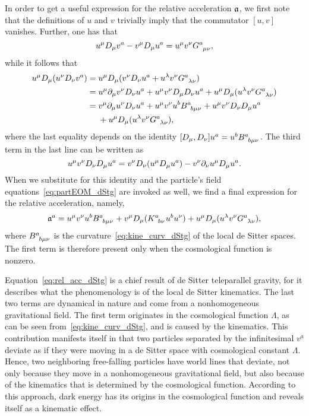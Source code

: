 \documentclass[
final,
11pt,
a4paper,
DIV=11,
headinclude=true,
footinclude=false,
bibliography=totoc,
twoside=true,  %
BCOR=5mm
]{scrbook}
\begin{document}
In order to get a useful expression for the relative acceleration 
$\mathfrak{a}$, we first note that the definitions of $u$ and $v$ 
trivially imply that the commutator $[u, v]$ vanishes. Further, 
one has that
\begin{equation*}
  u^\mu D_\mu v^a - v^\mu D_\mu u^a = u^\mu v^\nu 
  G\ind{^a_{\mu\nu}},
\end{equation*}
while it follows that
\begin{align*}
  u^\mu D_\mu (u^\nu D_\nu v^a)
  &= u^\mu D_\mu (v^\nu D_\nu u^a + u^\lambda v^\nu 
  G\ind{^a_{\lambda\nu}})
  \\
  &= u^\mu \pd_\mu v^\nu D_\nu u^a + u^\mu v^\nu D_\mu D_\nu u^a 
  + u^\mu D_\mu (u^\lambda v^\nu G\ind{^a_{\lambda\nu}})
  \\
  &= v^\mu \pd_\mu u^\nu D_\nu u^a + u^\mu v^\nu u^b 
  B\ind{^a_{b\mu\nu}} + u^\mu v^\nu D_\nu D_\mu u^a \\
  &\nla{} + u^\mu D_\mu (u^\lambda v^\nu G\ind{^a_{\lambda\nu}}),
\end{align*}
where the last equality depends on the identity $[D_\mu, D_\nu] 
u^a = u^b B\ind{^a_{b\mu\nu}}$. The third term in the last line 
can be written as 
\begin{equation*}
  u^\mu v^\nu D_\nu D_\mu u^a = v^\nu D_\nu (u^\mu D_\mu u^a) 
  - v^\nu \partial_\nu u^\mu D_\mu u^a.
\end{equation*}
When we substitute for this identity and the particle's field 
equations~\eqref{eq:partEOM_dStg} are invoked as well, we find 
a final expression for the relative acceleration, namely,
\begin{equation}
\label{eq:rel_acc_dStg}
  \mf{a}^a = u^\mu v^\nu u^b B\ind{^a_{b\mu\nu}} + v^\mu D_\mu 
  (K\ind{^a_{b\nu}} u^b u^\nu) + u^\mu D_\mu (u^\lambda v^\nu 
  G\ind{^a_{\lambda\nu}}),
\end{equation}
where $B\ind{^a_{b\mu\nu}}$ is the
curvature~\eqref{eq:kine_curv_dStg} of the local de Sitter 
spaces. The first term is therefore present only when the 
cosmological function is nonzero.

Equation~\eqref{eq:rel_acc_dStg} is a chief result of de Sitter 
teleparallel gravity, for it describes what the phenomenology is 
of the local de Sitter kinematics. The last two terms are 
dynamical in nature and come from a nonhomogeneous gravitational 
field. The first term originates in the cosmological function 
$\Lambda$, as can be seen from~\eqref{eq:kine_curv_dStg}, and is 
caused by the kinematics.  This contribution manifests itself in 
that two particles separated by the infinitesimal $v^a$ deviate 
as if they were moving in a de Sitter space with cosmological 
constant $\Lambda$. Hence, two neighboring free-falling particles 
have world lines that deviate, not only because they move in 
a nonhomogeneous gravitational field, but also because of the 
kinematics that is determined by the cosmological function.  
According to this approach, dark energy has its origins in the 
cosmological function and reveals itself as a kinematic effect.
\end{document}
